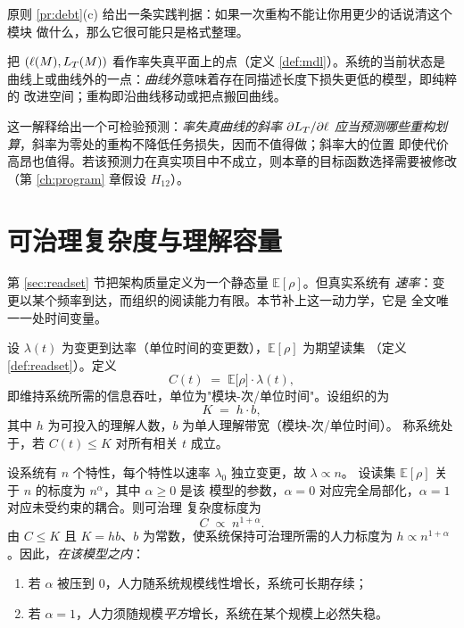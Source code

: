 原则 \ref{pr:debt}(c) 给出一条实践判据：如果一次重构不能让你用更少的话说清这个模块
做什么，那么它很可能只是格式整理。

\begin{remark}[重构的率失真解释]\label{rmk:rd-refactor}
把 $(\ell(M), L_T(M))$ 看作率失真平面上的点\cite{shannon1959}（定义 \ref{def:mdl}）。系统的当前状态是
曲线上或曲线外的一点：\emph{曲线外}意味着存在同描述长度下损失更低的模型，即纯粹的
改进空间；重构即沿曲线移动或把点搬回曲线。

这一解释给出一个可检验预测：\emph{率失真曲线的斜率 $\partial L_T / \partial \ell$
应当预测哪些重构划算}，斜率为零处的重构不降低任务损失，因而不值得做；斜率大的位置
即使代价高昂也值得。若该预测力在真实项目中不成立，则本章的目标函数选择需要被修改
（第 \ref{ch:program} 章假设 $H_{12}$）。
\end{remark}

\section{可治理复杂度与理解容量}\label{sec:governable}

第 \ref{sec:readset} 节把架构质量定义为一个静态量 $\mathbb{E}[\rho]$。但真实系统有
\emph{速率}：变更以某个频率到达，而组织的阅读能力有限。本节补上这一动力学，它是
全文唯一一处时间变量。

\begin{definition}[可治理复杂度与理解容量]\label{def:governable}
设 $\lambda(t)$ 为变更到达率（单位时间的变更数），$\mathbb{E}[\rho]$ 为期望读集
（定义 \ref{def:readset}）。定义
\begin{equation}\label{eq:governable}
C(t) \;=\; \mathbb{E}\bigl[\rho\bigr] \cdot \lambda(t),
\end{equation}
即维持系统所需的信息吞吐，单位为"模块-次/单位时间"。设组织的为
\begin{equation}\label{eq:capacity}
K \;=\; h \cdot b,
\end{equation}
其中 $h$ 为可投入的理解人数，$b$ 为单人理解带宽（模块-次/单位时间）。
称系统处于，若 $C(t) \le K$ 对所有相关 $t$ 成立。
\end{definition}

\begin{proposition}[容量模型下所需人力的标度指数]\label{prop:exponent}
设系统有 $n$ 个特性，每个特性以速率 $\lambda_0$ 独立变更，故 $\lambda \propto n$。
设读集 $\mathbb{E}[\rho]$ 关于 $n$ 的标度为 $n^{\alpha}$，其中 $\alpha \ge 0$ 是该
模型的参数，$\alpha = 0$ 对应完全局部化，$\alpha = 1$ 对应未受约束的耦合。则可治理
复杂度标度为
\begin{equation}\label{eq:exponent}
C \;\propto\; n^{1+\alpha}.
\end{equation}
由 $C \le K$ 且 $K = hb$、$b$ 为常数，使系统保持可治理所需的人力标度为
$h \propto n^{1+\alpha}$。因此，\emph{在该模型之内}：
\begin{enumerate}[label=(\alph*)]
\item 若 $\alpha$ 被压到 $0$，人力随系统规模线性增长，系统可长期存续；
\item 若 $\alpha = 1$，人力须随规模\emph{平方}增长，系统在某个规模上必然失稳。
\end{enumerate}
\end{proposition}

